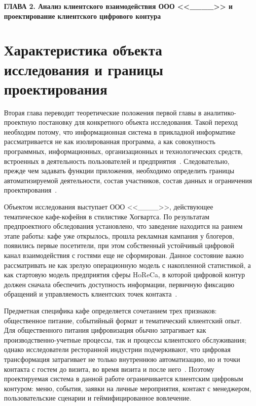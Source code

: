 
\newpage
\begin{center}
  \textbf{\large ГЛАВА 2. Анализ клиентского взаимодействия ООО <<\_\_\_\_>> и проектирование клиентского цифрового контура}
\end{center}

\section{Характеристика объекта исследования и границы проектирования}

Вторая глава переводит теоретические положения первой главы в аналитико-проектную постановку для конкретного объекта исследования. Такой переход необходим потому, что информационная система в прикладной информатике рассматривается не как изолированная программа, а как совокупность программных, информационных, организационных и технологических средств, встроенных в деятельность пользователей и предприятия~\cite{utkin_baldin_2003,gost34003}. Следовательно, прежде чем задавать функции приложения, необходимо определить границы автоматизируемой деятельности, состав участников, состав данных и ограничения проектирования~\cite{kovalenko2014,gost34_601}.

Объектом исследования выступает ООО <<\_\_\_\_>>, действующее тематическое кафе-кофейня в стилистике Хогвартса. По результатам предпроектного обследования установлено, что заведение находится на раннем этапе работы: кафе уже открылось, прошла рекламная кампания у блогеров, появились первые посетители, при этом собственный устойчивый цифровой канал взаимодействия с гостями еще не сформирован. Данное состояние важно рассматривать не как зрелую операционную модель с накопленной статистикой, а как стартовую модель предприятия сферы HoReCa, в которой цифровой контур должен сначала обеспечить доступность информации, первичную фиксацию обращений и управляемость клиентских точек контакта~\cite{klientskiy_opyt_horeca,batsyna2020}.

Предметная специфика кафе определяется сочетанием трех признаков: общественное питание, событийный формат и тематический клиентский опыт. Для общественного питания цифровизация обычно затрагивает как производственно-учетные процессы, так и процессы клиентского обслуживания; однако исследователи ресторанной индустрии подчеркивают, что цифровая трансформация затрагивает не только внутреннюю автоматизацию, но и точки контакта с гостем до визита, во время визита и после него~\cite{alt2021,kandalenkova2023}. Поэтому проектируемая система в данной работе ограничивается клиентским цифровым контуром: меню, события, заявки на личные мероприятия, контакт с менеджером, пользовательские сценарии и геймифицированное вовлечение.

